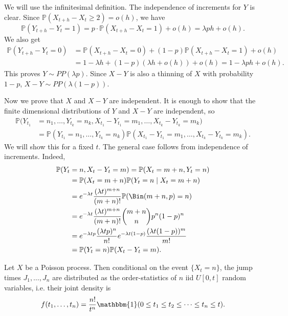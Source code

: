 \documentclass[12pt]{article}
\begin{document}
\begin{proofbox}
	We will use the infinitesimal definition. The independence of increments for $Y$ is clear. Since $\mathbb{P}(X_{t+h} - X_t \geq 2) = o(h)$, we have
	\[
	\mathbb{P}(Y_{t+h} - Y_t = 1) = p \cdot\mathbb{P}(X_{t+h} - X_t = 1) + o(h) = \lambda p h + o(h)
	.\]
	We also get
	\begin{align*}
		\mathbb{P}(Y_{t+h} - Y_t = 0) &= \mathbb{P}(X_{t+h} - X_t = 0) + (1-p)\mathbb{P}(X_{t+h}-X_t = 1) + o(h) \\
					      &= 1 - \lambda h + (1-p)(\lambda h + o(h)) + o(h) = 1 - \lambda p h + o(h).
	\end{align*}
	This proves $Y \sim PP(\lambda p)$. Since $X - Y$ is also a thinning of $X$ with probability $1 - p$, $X - Y \sim PP(\lambda(1-p))$.

	Now we prove that $X$ and $X - Y$ are independent. It is enough to show that the finite dimensional distributions of $Y$ and $X-Y$ are independent, so
	\begin{align*}
		\mathbb{P}(Y_{t_1} &= n_1, \ldots, Y_{t_k} = n_k, X_{t_1} - Y_{t_1} = m_1, \ldots, X_{t_k} - Y_{t_k} = m_k) \\
				   &= \mathbb{P}(Y_{t_1} = n_1, \ldots, Y_{t_k} = n_k) \mathbb{P}(X_{t_1} - Y_{t_1} = m_1, \ldots, X_{t_k} - Y_{t_k} = m_k).
	\end{align*}
	We will show this for a fixed $t$. The general case follows from independence of increments. Indeed,
	\begin{align*}
		\mathbb{P}(Y_t &= n, X_t - Y_t = m) = \mathbb{P}(X_t = m+n, Y_t = n) \\
			       &= \mathbb{P}(X_t = m+n) \mathbb{P}(Y_t = n \mid X_t = m + n) \\
			       &= e^{-\lambda t} \frac{(\lambda t)^{m+n}}{(m+n)!} \mathbb{P}(\Bin(m+n,p) = n) \\
			       &= e^{-\lambda t} \frac{(\lambda t)^{m+n}}{(m+n)!} \binom{m+n}{n} p^{n}(1-p)^{n} \\
			       &= e^{-\lambda t p}\frac{(\lambda tp)^{n}}{n!} e^{-\lambda t(1-p)} \frac{(\lambda t(1-p))^{m}}{m!} \\
			       &= \mathbb{P}(Y_t = n) \mathbb{P}(X_t - Y_t = m).
	\end{align*}
\end{proofbox}

\begin{theorem}
	Let $X$ be a Poisson process. Then conditional on the event $\{X_t = n\}$, the jump times $J_1, \ldots, J_n$ are distributed as the order-statistics of $n$ iid $U[0,t]$ random variables, i.e. their joint density is
	\[
		f(t_1, \ldots, t_n) = \frac{n!}{t^{n}} \mathbbm{1} (0 \leq t_1 \leq t_2 \leq \cdots \leq t_n \leq t)
	.\]
\end{theorem}
\end{document}
